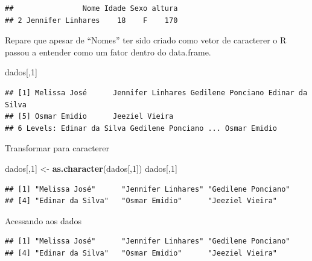 \documentclass[]{book}
\newenvironment{Shaded}{\begin{snugshade}}{\end{snugshade}}
\newcommand{\DecValTok}[1]{\textcolor[rgb]{0.00,0.00,0.81}{#1}}
\newcommand{\KeywordTok}[1]{\textcolor[rgb]{0.13,0.29,0.53}{\textbf{#1}}}
\newcommand{\NormalTok}[1]{#1}
\newcommand{\OperatorTok}[1]{\textcolor[rgb]{0.81,0.36,0.00}{\textbf{#1}}}
\newcommand{\StringTok}[1]{\textcolor[rgb]{0.31,0.60,0.02}{#1}}
\begin{document}
\begin{verbatim}
##                Nome Idade Sexo altura
## 2 Jennifer Linhares    18    F    170
\end{verbatim}

Repare que apesar de ``Nomes'' ter sido criado como vetor de caracterer o R passou a entender como um fator dentro do data.frame.

\begin{Shaded}
\begin{Highlighting}[]
\NormalTok{dados[,}\DecValTok{1}\NormalTok{]}
\end{Highlighting}
\end{Shaded}

\begin{verbatim}
## [1] Melissa José      Jennifer Linhares Gedilene Ponciano Edinar da Silva  
## [5] Osmar Emidio      Jeeziel Vieira   
## 6 Levels: Edinar da Silva Gedilene Ponciano ... Osmar Emidio
\end{verbatim}

Transformar para caracterer

\begin{Shaded}
\begin{Highlighting}[]
\NormalTok{dados[,}\DecValTok{1}\NormalTok{] <-}\StringTok{ }\KeywordTok{as.character}\NormalTok{(dados[,}\DecValTok{1}\NormalTok{])}
\NormalTok{dados[,}\DecValTok{1}\NormalTok{]}
\end{Highlighting}
\end{Shaded}

\begin{verbatim}
## [1] "Melissa José"      "Jennifer Linhares" "Gedilene Ponciano"
## [4] "Edinar da Silva"   "Osmar Emidio"      "Jeeziel Vieira"
\end{verbatim}

Acessando aos dados

\begin{Shaded}
\end{Shaded}

\begin{verbatim}
## [1] "Melissa José"      "Jennifer Linhares" "Gedilene Ponciano"
## [4] "Edinar da Silva"   "Osmar Emidio"      "Jeeziel Vieira"
\end{verbatim}

\begin{Shaded}
\end{Shaded}
\end{document}

